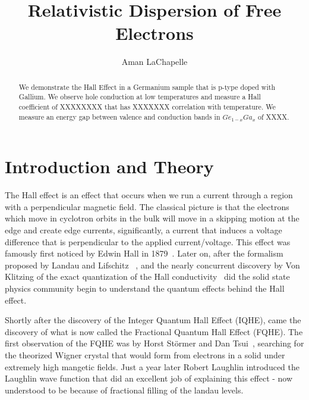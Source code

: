 \documentclass[reprint, nobibnotes, amssymb, amsmath, amsfonts, physics, mathtools, mathrsfs, floatfix]{revtex4-1}
\begin{document}
  \title{Relativistic Dispersion of Free Electrons}

  \author{Aman LaChapelle}

  \begin{abstract}
    We demonstrate the Hall Effect in a Germanium sample that is p-type doped with Gallium.  We observe hole conduction at low temperatures and measure a Hall coefficient of XXXXXXXX that has XXXXXXX correlation with temperature.  We measure an energy gap between valence and conduction bands in $Ge_{1-x}Ga_x$ of XXXX.
  \end{abstract}

  \maketitle
  \tableofcontents

  \section{Introduction and Theory}
    The Hall effect is an effect that occurs when we run a current through a region with a perpendicular magnetic field.  The classical picture is that the electrons which move in cyclotron orbits in the bulk will move in a skipping motion at the edge and create edge currents, significantly, a current that induces a voltage difference that is perpendicular to the applied current/voltage.  This effect was famously first noticed by Edwin Hall in 1879~\cite{classical_hall}.  Later on, after the formalism proposed by Landau and Lifschitz ~\cite{landau}, and the nearly concurrent discovery by Von Klitzing of the exact quantization of the Hall conductivity~\cite{Von_Klitzing} did the solid state physics community begin to understand the quantum effects behind the Hall effect.

    Shortly after the discovery of the Integer Quantum Hall Effect (IQHE), came the discovery of what is now called the Fractional Quantum Hall Effect (FQHE).  The first observation of the FQHE was by Horst St\"{o}rmer and Dan Tsui~\cite{stormer_tsui}, searching for the theorized Wigner crystal that would form from electrons in a solid under extremely high mangetic fields.  Just a year later Robert Laughlin introduced the Laughlin wave function that did an excellent job of explaining this effect - now understood to be because of fractional filling of the landau levels.
\end{document}
